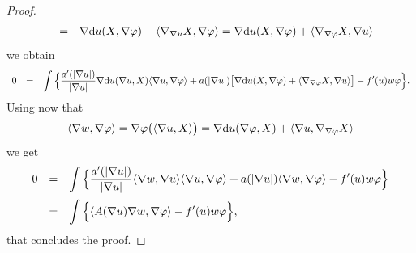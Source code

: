 \documentclass[10 pt,a4paper]{article}
\theoremstyle{definition}
\begin{document}
\begin{proof}
$$\begin{array}{lcl}
		& = & \displaystyle \nabla \mathrm{d}  u(X, \nabla \varphi) - \langle \nabla_{\nabla u} X, \nabla \varphi \rangle = \displaystyle \nabla \mathrm{d}  u(X, \nabla \varphi) + \langle \nabla_{\nabla \varphi} X, \nabla u \rangle
	\end{array}
	$$
	we obtain
	\begin{equation}\label{diffeinte_2}
		\begin{array}{lcl}
			0 & = & \displaystyle \displaystyle \displaystyle \int \Big\{ \frac{a'(|\nabla u|)}{|\nabla u|} \nabla \mathrm{d}  u(\nabla u,X) \langle \nabla u, \nabla \varphi\rangle + a(|\nabla u|) \big[\nabla \mathrm{d}  u(X, \nabla \varphi) + \langle \nabla_{\nabla \varphi} X, \nabla u \rangle\big] - f'(u)w \varphi\Big\}.
		\end{array}
	\end{equation}
	Using now that 
	$$
	\langle \nabla w, \nabla \varphi \rangle = \nabla \varphi\big( \langle \nabla u, X \rangle \big) = \nabla \mathrm{d}  u (\nabla \varphi, X) + \langle \nabla u, \nabla_{\nabla \varphi}X\rangle
	$$
	we get
	\begin{equation}\label{final}
		\begin{array}{lcl}
			0 & = & \displaystyle \int \Big\{\frac{a'(|\nabla u|)}{|\nabla u|} \langle \nabla w, \nabla u \rangle \langle \nabla u, \nabla \varphi \rangle + a(|\nabla u|)\langle \nabla w, \nabla \varphi \rangle - f'(u)w \varphi\Big\} \\[0.4cm]
			& = & \displaystyle \int \Big\{ \langle A(\nabla u)\nabla w, \nabla \varphi \rangle - f'(u)w \varphi \Big\},
		\end{array}
	\end{equation}
	that concludes the proof. 
\end{proof}
\end{document}
